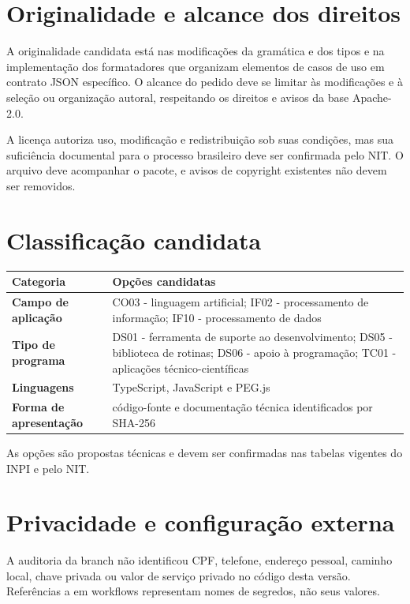 \documentclass[11pt,a4paper]{article}
\newcommand{\code}[1]{\texttt{\detokenize{#1}}}
\begin{document}
\section{Originalidade e alcance dos direitos}

A originalidade candidata está nas modificações da gramática e dos tipos e na implementação dos formatadores que organizam elementos de casos de uso em contrato JSON específico. O alcance do pedido deve se limitar às modificações e à seleção ou organização autoral, respeitando os direitos e avisos da base Apache-2.0.

A licença autoriza uso, modificação e redistribuição sob suas condições, mas sua suficiência documental para o processo brasileiro deve ser confirmada pelo NIT. O arquivo \code{LICENSE} deve acompanhar o pacote, e avisos de copyright existentes não devem ser removidos.

\section{Classificação candidata}

\begin{longtable}{>{\bfseries}p{4.0cm}p{10.0cm}}
\toprule
Categoria & Opções candidatas \\
\midrule
\endhead
Campo de aplicação & CO03 - linguagem artificial; IF02 - processamento de informação; IF10 - processamento de dados \\
Tipo de programa & DS01 - ferramenta de suporte ao desenvolvimento; DS05 - biblioteca de rotinas; DS06 - apoio à programação; TC01 - aplicações técnico-científicas \\
Linguagens & TypeScript, JavaScript e PEG.js \\
Forma de apresentação & código-fonte e documentação técnica identificados por SHA-256 \\
\bottomrule
\end{longtable}

As opções são propostas técnicas e devem ser confirmadas nas tabelas vigentes do INPI e pelo NIT.

\section{Privacidade e configuração externa}

A auditoria da branch não identificou CPF, telefone, endereço pessoal, caminho local, chave privada ou valor de serviço privado no código desta versão. Referências a \code{secrets} em workflows representam nomes de segredos, não seus valores.
\end{document}
